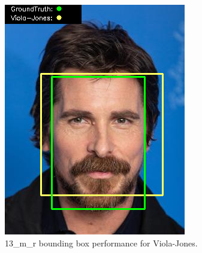 \documentclass{l4proj}
\begin{document}
\begin{appendices}
\begin{figure}[h!]
\begin{minipage}{0.49\textwidth}
     \includegraphics[width=\textwidth]{images/appendix/viola/13.png}
    \caption{13\_m\_r bounding box performance for Viola-Jones.}
    \label{whoopi_result}
  \end{minipage}
\end{figure}


\end{appendices}
\end{document}
